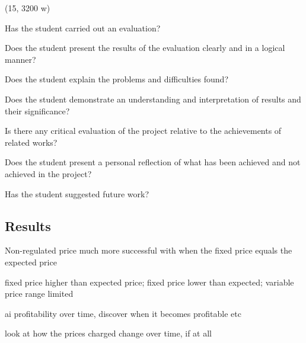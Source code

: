 (15, 3200 w)

Has the student carried out an evaluation?

Does the student present the results of the evaluation clearly and in a logical
manner?

Does the student explain the problems and difficulties found?

Does the student demonstrate an understanding and interpretation of results and
their significance?

Is there any critical evaluation of the project relative to the achievements of
related works?

Does the student present a personal reflection of what has been achieved and
not achieved in the project?

Has the student suggested future work?


\subsection{Results}

Non-regulated price much more successful with when the fixed
price equals the expected price

 fixed price higher than expected price; fixed price lower
than expected; variable price range limited

ai profitability over time, discover when it becomes profitable etc

look at how the prices charged change over time, if at all
